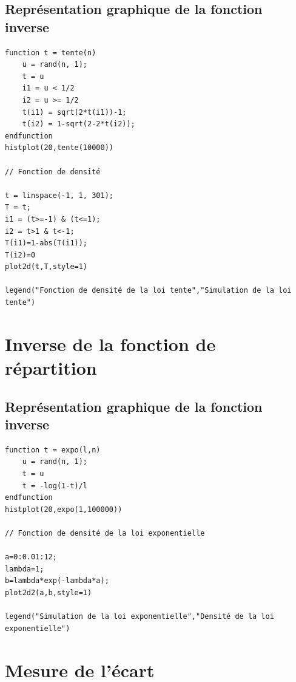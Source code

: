 \documentclass{article}
\begin{document}
\subsection{Représentation graphique de la fonction inverse}
\begin{verbatim}
function t = tente(n)
    u = rand(n, 1);
    t = u
    i1 = u < 1/2
    i2 = u >= 1/2
    t(i1) = sqrt(2*t(i1))-1;
    t(i2) = 1-sqrt(2-2*t(i2));
endfunction
histplot(20,tente(10000))

// Fonction de densité 

t = linspace(-1, 1, 301);
T = t;
i1 = (t>=-1) & (t<=1);
i2 = t>1 & t<-1;
T(i1)=1-abs(T(i1));
T(i2)=0
plot2d(t,T,style=1)

legend("Fonction de densité de la loi tente","Simulation de la loi tente")
\end{verbatim}

\section{Inverse de la fonction de répartition}

\subsection{Représentation graphique de la fonction inverse}
\begin{verbatim}
function t = expo(l,n)
    u = rand(n, 1);
    t = u
    t = -log(1-t)/l 
endfunction
histplot(20,expo(1,100000))

// Fonction de densité de la loi exponentielle

a=0:0.01:12;
lambda=1;
b=lambda*exp(-lambda*a);
plot2d2(a,b,style=1)

legend("Simulation de la loi exponentielle","Densité de la loi exponentielle")
\end{verbatim}

\section{Mesure de l'écart}
\end{document}
